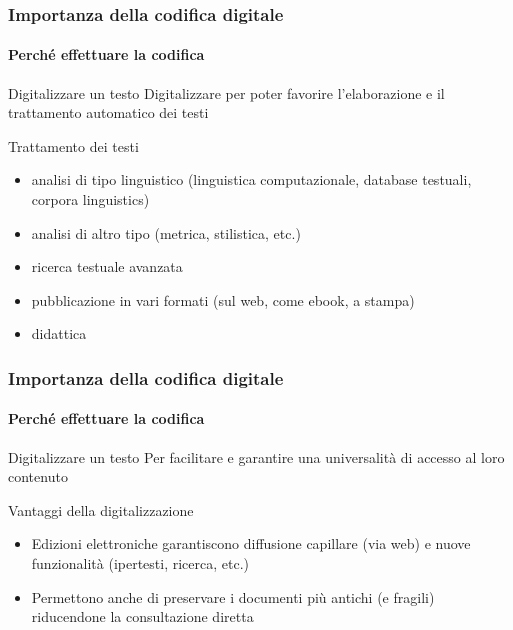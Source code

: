 
\begin{frame}
	\frametitle{Importanza della codifica digitale}
	\framesubtitle{Perché effettuare la codifica}
	\addtocounter{nframe}{1}

	\begin{block}{Digitalizzare un testo}
		Digitalizzare per poter favorire l'elaborazione e il trattamento automatico dei testi
	\end{block}

	\begin{block}{Trattamento dei testi}
        \begin{itemize}
            \item  analisi di tipo linguistico (linguistica computazionale,
            database testuali, corpora linguistics)
            \item analisi di altro tipo (metrica, stilistica, etc.)
            \item ricerca testuale avanzata
            \item pubblicazione in vari formati (sul web, come ebook, a
            stampa)
            \item didattica
        \end{itemize}
 
    \end{block}
\end{frame}

\begin{frame}
	\frametitle{Importanza della codifica digitale}
	\framesubtitle{Perché effettuare la codifica}
	\addtocounter{nframe}{1}

	\begin{block}{Digitalizzare un testo}
		Per facilitare e garantire una universalità di accesso al loro contenuto 
	\end{block}

	\begin{block}{Vantaggi della digitalizzazione}
        \begin{itemize}
            \item Edizioni elettroniche garantiscono diffusione capillare
            (via web) e nuove funzionalità (ipertesti, ricerca, etc.)
            \item Permettono anche di preservare i documenti più antichi
            (e fragili) riducendone la consultazione diretta
        \end{itemize}
     \end{block}
\end{frame}

